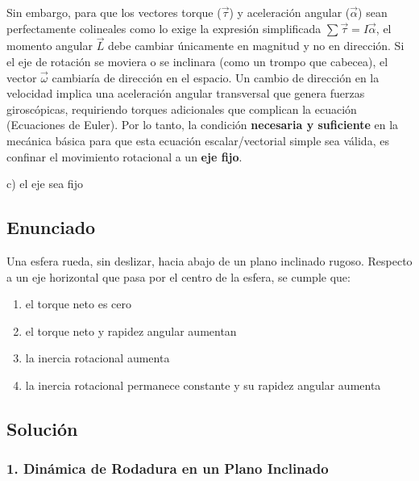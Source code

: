 \documentclass[12pt, a4paper]{article}
\begin{document}
Sin embargo, para que los vectores torque ($\vec{\tau}$) y aceleración angular ($\vec{\alpha}$) sean perfectamente colineales como lo exige la expresión simplificada $\sum \vec{\tau} = I \vec{\alpha}$, el momento angular $\vec{L}$ debe cambiar únicamente en magnitud y no en dirección. 
Si el eje de rotación se moviera o se inclinara (como un trompo que cabecea), el vector $\vec{\omega}$ cambiaría de dirección en el espacio. Un cambio de dirección en la velocidad implica una aceleración angular transversal que genera fuerzas giroscópicas, requiriendo torques adicionales que complican la ecuación (Ecuaciones de Euler).
Por lo tanto, la condición \textbf{necesaria y suficiente} en la mecánica básica para que esta ecuación escalar/vectorial simple sea válida, es confinar el movimiento rotacional a un \textbf{eje fijo}.

\begin{tcolorbox}[colback=green!5!white, colframe=green!50!black, title=Respuesta Final]
\centering \Large c) el eje sea fijo
\end{tcolorbox}

\newpage

\subsection*{Enunciado}
Una esfera rueda, sin deslizar, hacia abajo de un plano inclinado rugoso. Respecto a un eje horizontal que pasa por el centro de la esfera, se cumple que:
\begin{enumerate}[label=\alph*)]
    \item el torque neto es cero
    \item el torque neto y rapidez angular aumentan
    \item la inercia rotacional aumenta
    \item la inercia rotacional permanece constante y su rapidez angular aumenta
\end{enumerate}

\subsection*{Solución}

\subsubsection*{1. Dinámica de Rodadura en un Plano Inclinado}
\end{document}
